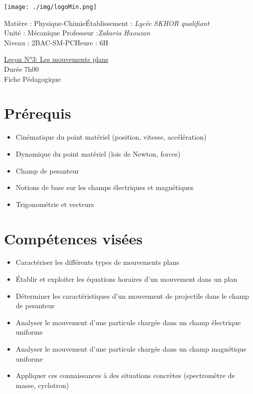 \documentclass[12pt]{article}
\newcommand\headerMe[2]{\noindent{}#1\hfill#2}
\begin{document}
\begin{center}
	\texttt{[image: ./img/logoMin.png]}
	\vspace{-3cm}
\end{center}
\headerMe{Matière : Physique-Chimie}{Établissement : \emph{Lycée SKHOR qualifiant}}\\
\headerMe{ Unité : Mécanique }{  Professeur :\emph{Zakaria Haouzan}}\\
\headerMe{Niveau : 2BAC-SM-PC}{Heure : 6H}\\

\begin{center}
	\underline{Leçon N°3: Les mouvements plans}\\
	Durée 7h00
	\\
	\vspace{.2cm}
	\hrulefill
	\Large{Fiche Pédagogique}
	\hrulefill\\
\end{center}


\section*{Prérequis}
\begin{itemize}
    \item Cinématique du point matériel (position, vitesse, accélération)
    \item Dynamique du point matériel (lois de Newton, forces)
    \item Champ de pesanteur
    \item Notions de base sur les champs électriques et magnétiques
    \item Trigonométrie et vecteurs
\end{itemize}

\section*{Compétences visées}
\begin{itemize}
    \item Caractériser les différents types de mouvements plans
    \item Établir et exploiter les équations horaires d'un mouvement dans un plan
    \item Déterminer les caractéristiques d'un mouvement de projectile dans le champ de pesanteur
    \item Analyser le mouvement d'une particule chargée dans un champ électrique uniforme
    \item Analyser le mouvement d'une particule chargée dans un champ magnétique uniforme
    \item Appliquer ces connaissances à des situations concrètes (spectromètre de masse, cyclotron)
\end{itemize}
\end{document}
